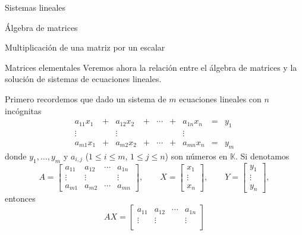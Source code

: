 \documentclass[a4paper,12pt,twoside,spanish,reqno]{amsbook}
\numberwithin{equation}{section}
\theoremstyle{definition}
\theoremstyle{remark}
\newcommand{\K}{\mathbb K}
\begin{document}
\begin{chapter}{Sistemas lineales}
\begin{section}{Álgebra de matrices}
\begin{subsection}{Multiplicación de una matriz por un escalar}
        \end{subsection}
            
            
        \end{section}
        
        \begin{section}{Matrices elementales}\label{seccion-matrices-elementales}
            Veremos ahora la relación entre el álgebra de matrices y la solución de sistemas de ecuaciones lineales. 
            
            Primero recordemos que dado un sistema de $m$  ecuaciones lineales con $n$ incógnitas
            \begin{equation}\label{sist-eq-gen-3}
            \begin{matrix} 
            a_{11}x_1& + &a_{12}x_2& + &\cdots& + &a_{1n}x_n &= &y_1\\
            \vdots&  &\vdots& &&  &\vdots \\
            a_{m1}x_1& + &a_{m2}x_2& + &\cdots& + &a_{mn}x_n &=&y_m
            \end{matrix}
            \end{equation}
            donde $y_1, \ldots,y_m$ y $a_{i,j}$ ($1 \le i \le m$, $1 \le j \le n$) son números en $\K$. Si denotamos
            \begin{equation*}
            A = \begin{bmatrix}
            a_{11}& a_{12}& \cdots &a_{1n} \\
            \vdots&\vdots  &  &\vdots \\
            a_{m1} &a_{m2}&\cdots &a_{mn}\end{bmatrix},\qquad
            X = \begin{bmatrix}
            x_1 \\ \vdots \\ x_n 
            \end{bmatrix},
            \qquad 
            Y = \begin{bmatrix}
            y_1 \\ \vdots \\ y_n
            \end{bmatrix},
            \end{equation*}
            entonces 
            \begin{equation*}
            AX = \begin{bmatrix}
            a_{11}& a_{12}& \cdots &a_{1n} \\
            \vdots&\vdots  &  &\vdots \\

\end{bmatrix}
\end{equation*}
\end{section}
\end{chapter}
\end{document}
